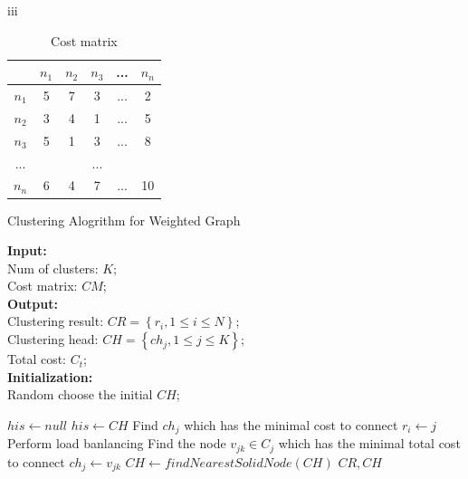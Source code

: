 \documentclass[conference]{IEEEtran}
\begin{document}
iii

\begin{table}[htbp]
\centering
\begin{tabular}{|c|c|c|c|c|c|}
\hline
 & $n_1$ & $n_2$ & $n_3$ & ... & $n_n$ \\
\hline
$n_1$ & 5 & 7 & 3 & ... & 2 \\
\hline
$n_2$ & 3 & 4 & 1 & ... & 5 \\
\hline
$n_3$ & 5 & 1 & 3 & ... & 8 \\
\hline
... & \multicolumn{5}{c|}{...} \\
\hline
$n_n$ & 6 & 4 & 7 & ... & 10 \\
\hline
\end{tabular}
\caption{Cost matrix}
\label{cost_matrix}
\end{table}

\begin{algorithm}[htbp]
\caption{Clustering Alogrithm for Weighted Graph}
{\bf Input:}\\
\hspace*{0.1in}Num of clusters: $K$;\\
\hspace*{0.1in}Cost matrix: $CM$;\\
{\bf Output:}\\
\hspace*{0.1in}Clustering result: $CR=\left \{ r_{i}, 1 \leqslant i \leqslant N \right \}$;\\
\hspace*{0.1in}Clustering head: $CH=\left \{ ch_{j}, 1 \leqslant j \leqslant K \right \}$;\\
\hspace*{0.1in}Total cost: $C_t$;\\
{\bf Initialization:}\\
\hspace*{0.1in}Random choose the initial $CH$;
\begin{algorithmic}[1]
\State $his \leftarrow null$
    \State $his \leftarrow CH$
        \State Find $ch_j$ which has the minimal cost to connect
        \State $r_i \leftarrow j$
    \EndFor
    \State Perform load banlancing
        \State Find the node $v_{jk} \in C_j$ which has the minimal total cost to connect
        \State $ch_j \leftarrow v_{jk}$
    \EndFor
\EndWhile
\State $CH \leftarrow findNearestSolidNode(CH)$
\State \Return $CR, CH$
\end{algorithmic}
\end{algorithm}
\end{document}
